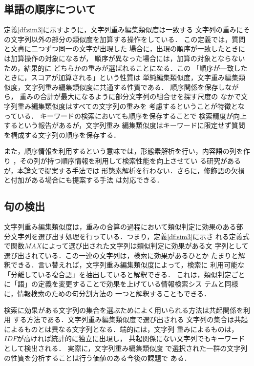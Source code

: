 \subsection{単語の順序について}
定義\ref{df:sim3}に示すように，文字列重み編集類似度は一致する
文字列の重みにその文字列以外の部分の類似度を加算する操作をしている．
この定義では，質問と文書に二つずつ同一の文字が出現した
場合に，出現の順序が一致したときには加算操作の対象になるが，
順序が異なった場合には，加算の対象とならないため，結果的に
どちらかの重みが選ばれることになる．この
「順序が一致したときに，スコアが加算される」という性質は
単純編集類似度，文字重み編集類似度，文字列重み編集類似度に共通する性質である．
順序関係を保存しながら，
重みの合計が最大になるように部分文字列の組合せを探す尺度の
なかで文字列重み編集類似度はすべての文字列の重みを
考慮するということが特徴となっている．
キーワードの検索においても順序を保存することで
検索精度が向上するという報告\cite{Tanaka97}があるが，文字列重み
編集類似度はキーワードに限定せず質問を構成する文字列の順序を保存する．

また，順序情報を利用するという意味では，形態素解析を行い，内容語の列を作り
，その列が持つ順序情報を利用して検索性能を向上させてい
る研究\cite{Otake99}があるが，本論文で提案する手法では
形態素解析を行わない．さらに，修飾語の欠損と付加がある場合にも提案する手法
は対応できる．

\subsection{句の検出}

文字列重み編集類似度は，重みの合算の過程において類似判定に効果のある部
分文字列を選び出す処理を行っている．つまり，定義\ref{df:sim3}に示さ
れる定義式で関数$MAX$によって選び出された文字列は類似判定に効果がある文
字列として選び出されている．この一連の文字列は，検索に効果があるひとか
たまりと解釈できる．言い替えれば，文字列重み編集類似度によって，検索に
利用可能な「分離している複合語」を抽出していると解釈できる．
これは，類似判定ごとに「語」の定義を変更することで効果を上げている情報検索シス
テム\cite{Ozawa99}と同様に，情報検索のための句分割方法の
一つと解釈することもできる．

検索に効果がある文字列の集合を選ぶためによく用いられる方法は共起関係を利用
する方法である\cite{Takagi96}．文字列重み編集類似度で選び出される
文字列の集合は共起によるものとは異なる文字列となる．端的には，文字列
重みによるものは，$IDF$が高ければ統計的に独立に出現し，
共起関係にない文字列でもキーワードとして検出される．
実際に，文字列重み編集類似度
で選択された一群の文字列の性質を分析することは行う価値のある今後の課題で
ある．

